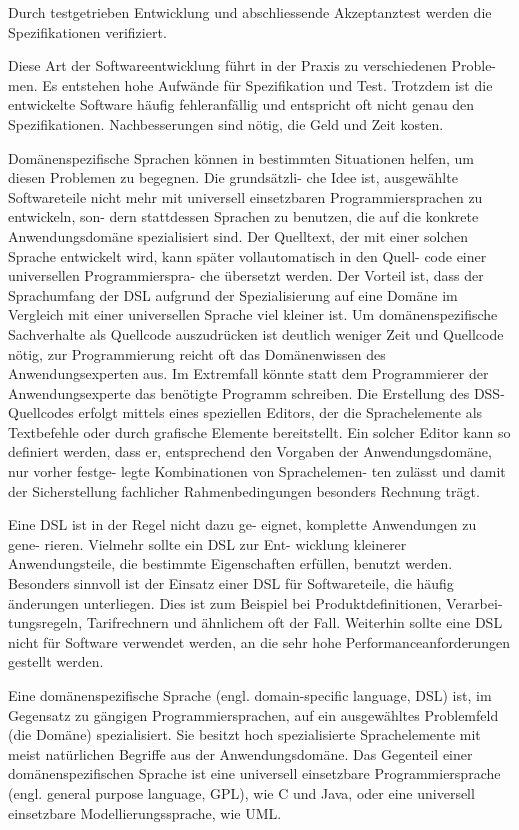 \documentclass[11pt,english,ngerman, headsepline]{scrreprt}
\begin{document}
Durch testgetrieben Entwicklung und abschliessende Akzeptanztest werden die
Spezifikationen verifiziert.




Diese Art der Softwareentwicklung führt in der Praxis zu verschiedenen Proble-
men. Es entstehen hohe Aufwände für Spezifikation und Test. Trotzdem ist die
entwickelte Software häufig fehleranfällig und entspricht oft nicht genau den
Spezifikationen. Nachbesserungen sind nötig, die Geld und Zeit kosten.
 
Domänenspezifische Sprachen können in bestimmten Situationen helfen, um diesen
Problemen zu begegnen. Die grundsätzli- che Idee ist, ausgewählte Softwareteile
nicht mehr mit universell einsetzbaren Programmiersprachen zu entwickeln, son-
dern stattdessen Sprachen zu benutzen, die auf die konkrete Anwendungsdomäne
spezialisiert sind. Der Quelltext, der mit einer solchen Sprache entwickelt
wird, kann später vollautomatisch in den Quell- code einer universellen
Programmierspra- che übersetzt werden. Der Vorteil ist, dass der Sprachumfang
der DSL aufgrund der Spezialisierung auf eine Domäne im Vergleich mit einer
universellen Sprache viel kleiner ist. Um domänenspezifische Sachverhalte als
Quellcode auszudrücken ist deutlich weniger Zeit und Quellcode nötig, zur
Programmierung reicht oft das  Domänenwissen des Anwendungsexperten aus. Im
Extremfall könnte statt dem Programmierer der Anwendungsexperte das benötigte
Programm schreiben. Die Erstellung des DSS-Quellcodes erfolgt mittels eines
speziellen Editors, der die Sprachelemente als Textbefehle oder durch grafische
Elemente bereitstellt.
Ein solcher Editor kann so definiert werden, dass er, entsprechend den Vorgaben
der Anwendungsdomäne, nur vorher festge- legte Kombinationen von Sprachelemen-
ten zulässt und damit der Sicherstellung fachlicher Rahmenbedingungen besonders
Rechnung trägt.


Eine DSL ist in der Regel nicht dazu ge- eignet, komplette Anwendungen zu gene-
rieren. Vielmehr sollte ein DSL zur Ent- wicklung kleinerer Anwendungsteile, die
bestimmte Eigenschaften erfüllen, benutzt werden. Besonders sinnvoll ist der
Einsatz einer DSL für Softwareteile, die häufig änderungen unterliegen. Dies
ist zum Beispiel bei Produktdefinitionen, Verarbei- tungsregeln, Tarifrechnern
und ähnlichem oft der Fall. Weiterhin sollte eine DSL nicht für Software
verwendet werden, an die sehr hohe Performanceanforderungen gestellt werden.
\cite{uniLeipzigTechRadar}

Eine domänenspezifische Sprache (engl. domain-specific language, DSL) ist, im
Gegensatz zu gängigen Programmiersprachen, auf ein ausgewähltes
 Problemfeld (die Domäne) spezialisiert. Sie besitzt hoch spezialisierte
Sprachelemente mit meist natürlichen Begriffe aus der Anwendungsdomäne.
Das Gegenteil einer domänenspezifischen Sprache ist eine universell einsetzbare
Programmiersprache (engl. general purpose language, GPL), wie C und Java, oder
eine universell einsetzbare Modellierungssprache, wie UML.
\end{document}
